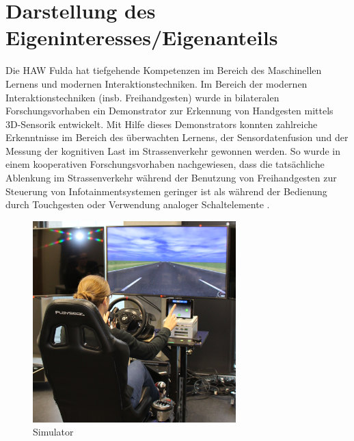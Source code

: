 \documentclass{article}
\begin{document}
\section{Darstellung des Eigeninteresses/Eigenanteils}
%
Die HAW Fulda hat tiefgehende Kompetenzen im Bereich des Maschinellen Lernens und modernen Interaktionstechniken. Im Bereich der modernen Interaktionstechniken (insb. Freihandgesten) wurde in bilateralen Forschungsvorhaben ein Demonstrator zur Erkennung von Handgesten mittels 3D-Sensorik entwickelt. Mit Hilfe dieses Demonstrators konnten zahlreiche Erkenntnisse im Bereich des überwachten Lernens, der Sensordatenfusion und der Messung der kognitiven Last im Strassenverkehr gewonnen werden. So wurde in einem kooperativen Forschungsvorhaben nachgewiesen, dass die tatsächliche Ablenkung im Strassenverkehr während der Benutzung von Freihandgesten zur Steuerung von Infotainmentsystemen geringer ist als während der Bedienung durch Touchgesten oder Verwendung analoger Schaltelemente \cite{kopinski2016touch}. 
%
\begin{figure}[ht]
	\centering
  \includegraphics[width=0.7\textwidth]{images/simulator.png}
	\caption{Simulator}
	\label{fig1}
\end{figure}
%
\end{document}
